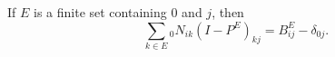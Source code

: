 If $E$ is a finite set containing $0$ and $j$, then
$$
\sum_{k \in E} {}_0N_{ik}(I - P^E)_{kj} = B_{ij}^E - \delta_{0j}.
$$
